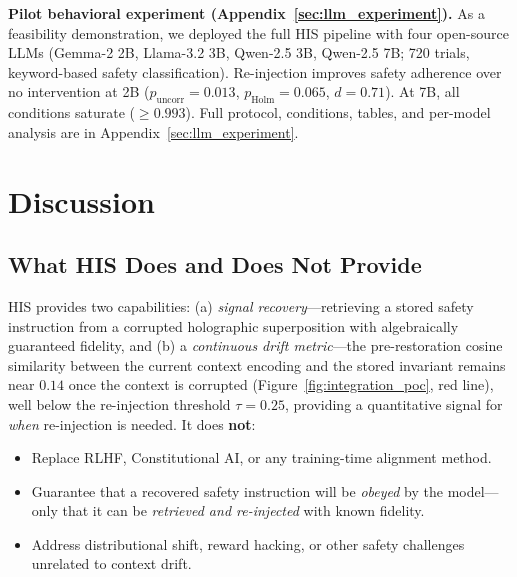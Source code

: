 \documentclass[a4paper,11pt]{article}
\begin{document}
\textbf{Pilot behavioral experiment (Appendix~\ref{sec:llm_experiment}).} As a feasibility demonstration, we deployed the full HIS pipeline with four open-source LLMs (Gemma-2 2B, Llama-3.2 3B, Qwen-2.5 3B, Qwen-2.5 7B; 720 trials, keyword-based safety classification). Re-injection improves safety adherence over no intervention at 2B ($p_{\text{uncorr}} = 0.013$, $p_{\text{Holm}} = 0.065$, $d = 0.71$). At 7B, all conditions saturate ($\geq 0.993$). Full protocol, conditions, tables, and per-model analysis are in Appendix~\ref{sec:llm_experiment}.

\section{Discussion}
\label{sec:discussion}

\subsection{What HIS Does and Does Not Provide}
HIS provides two capabilities: (a) \textit{signal recovery}---retrieving a stored safety instruction from a corrupted holographic superposition with algebraically guaranteed fidelity, and (b) a \textit{continuous drift metric}---the pre-restoration cosine similarity between the current context encoding and the stored invariant remains near $0.14$ once the context is corrupted (Figure~\ref{fig:integration_poc}, red line), well below the re-injection threshold $\tau = 0.25$, providing a quantitative signal for \textit{when} re-injection is needed. It does \textbf{not}:
\begin{itemize}
    \item Replace RLHF, Constitutional AI, or any training-time alignment method.
    \item Guarantee that a recovered safety instruction will be \textit{obeyed} by the model---only that it can be \textit{retrieved and re-injected} with known fidelity.
    \item Address distributional shift, reward hacking, or other safety challenges unrelated to context drift.
\end{itemize}
\end{document}

